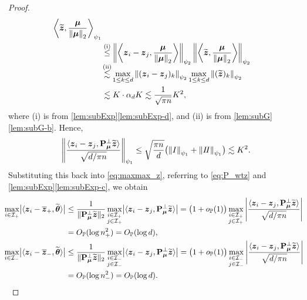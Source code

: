 \begin{proof}
\begin{align*}
{    \left\< \wt\zz, \frac{\vmu}{\norm{\vmu}_2} \right\>}_{\psi_1} \\
    & \overset{\mathmakebox[0pt][c]{\smash{\text{(i)}}}}{\le} \norm{\left\< \zz_i - \zz_j, \frac{\vmu}{\norm{\vmu}_2} \right\>}_{\psi_2}
    \norm{\left\< \wt\zz, \frac{\vmu}{\norm{\vmu}_2} \right\>}_{\psi_2} \\
    & \overset{\mathmakebox[0pt][c]{\smash{\text{(ii)}}}}{\lesssim}  \max_{1 \le k \le d} \norm{ (\zz_i - \zz_j)_k }_{\psi_2}
    \max_{1 \le k \le d} \norm{ (\wt\zz)_k }_{\psi_2} \\
    & \lesssim K \cdot \alpha_{d} K 
    \lesssim \frac{1}{\sqrt{\pi n}} K^2,
\end{align*}
where (i) is from \cref{lem:subExp}\ref{lem:subExp-d}, and (ii) is from \cref{lem:subG}\ref{lem:subG-b}. Hence,
\begin{equation*}
    \left\|{\frac{\langle \text{\boldmath $z$}_i - \text{\boldmath $z$}_j, \mathrm{\bf P}_{{\boldsymbol{\mu}}}^\perp \widetilde{\text{\boldmath $z$}} \rangle}{\sqrt{d/\pi n}}}\right\|_{\psi_1}
    \le \sqrt{\frac{\pi n}{d}} \bigl( \left\|{I}\right\|_{\psi_1} + \left\|{I\!I}\right\|_{\psi_1} \bigr)
    \lesssim K^2.
\end{equation*}
Substituting this back into \cref{eq:maxmax_z}, referring to \cref{eq:P_wtz} and \cref{lem:subExp}\ref{lem:subExp-c}, we obtain
\begin{align}
    \!\!\! \max_{i \in \mathcal{I}_+} \bigl| \< \zz_i - \bar\zz_+, \wt\vtheta \> \bigr|
        & \le \frac{1}{\| \bP_{\vmu}^\perp \wt\zz \|_2} \max_{\substack{i \in \mathcal{I}_+ \\ j \in \mathcal{I}_+}} \bigl| \< \zz_i - \zz_j, \bP_{\vmu}^\perp \wt\zz \>  \bigr|
    = \bigl(1 + o_\P(1)\bigr) \max_{\substack{i \in \mathcal{I}_+ \\ j \in \mathcal{I}_+}} \abs{\frac{\< \zz_i - \zz_j, \bP_{\vmu}^\perp \wt\zz \>}{\sqrt{d/\pi n}}}
    \notag \\
    & =  O_{\P}(\log n_+^2) = O_{\P}(\log d), \notag \\
    \!\!\! \max_{i \in \mathcal{I}_-} \bigl| \< \zz_i - \bar\zz_-, \wt\vtheta \> \bigr|
        & \le \frac{1}{\| \bP_{\vmu}^\perp \wt\zz \|_2} \max_{\substack{i \in \mathcal{I}_- \\ j \in \mathcal{I}_-}} \bigl| \< \zz_i - \zz_j, \bP_{\vmu}^\perp \wt\zz \>  \bigr|
    = \bigl(1 + o_\P(1)\bigr) \max_{\substack{i \in \mathcal{I}_- \\ j \in \mathcal{I}_-}} \abs{\frac{\< \zz_i - \zz_j, \bP_{\vmu}^\perp \wt\zz \>}{\sqrt{d/\pi n}}} \notag \\
    & =  O_{\P}(\log n_-^2) = O_{\P}(\log d).
    \label{eq:max_z}

\end{align}
\end{proof}
